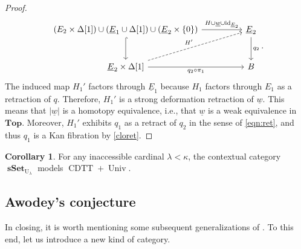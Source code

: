 \documentclass[10pt,letterpaper,cm]{nupset}
\theoremstyle{definition}
\theoremstyle{theorem}
\newtheorem{corollary}[definition]{Corollary}
\theoremstyle{remark}
\newcommand{\0}{\mathbf{0}}
\newcommand{\1}{\mathbf{1}}
\newcommand{\2}{\mathbf{2}}
\DeclareMathOperator{\cdtt}{\mathrm{CDTT}}
\DeclareMathOperator{\univ}{\mathrm{Univ}}
\DeclareMathOperator{\sset}{\mathbf{sSet}}
\DeclareMathOperator{\idd}{id}
\begin{document}
\begin{proof}
\[\begin{tikzcd}[column sep=huge, row sep=large]
{\left(E_2\times \Delta[1]\right)\cup \left(\underline{E}_1\cup \Delta[1]\right)\cup \left(\underline{E}_2\times \left\{0\right\}\right)} \arrow[d, hook] \arrow[r, "H\cup \underline{w}\cup\idd_{\underline{E}_2}"] & \underline{E}_2 \arrow[d, "q_2"] \\
{\underline{E}_2\times \Delta[1]} \arrow[r, "q_2\circ \pi_1"'] \arrow[ru, "H'", dashed]                                                                                          & B                   
\end{tikzcd}
.\]
The induced map $H_1'$ factors through $\underline{E}_1$ because $H_1$ factors through $E_1$ as a retraction of $q$. Therefore, $H_1'$ is a strong deformation retraction of $\underline{w}$. This means that $\left\lvert{\underline{w}}\right\rvert$ is a homotopy equivalence, i.e., that $\underline{w}$ is a weak equivalence in $\mathbf{Top}$. Moreover, $H_1'$ exhibits $q_1$ as a retract of $q_2$ in the sense of \eqref{eqn:ret}, and thus  $q_1$ is a Kan fibration by \cref{cloret}.


\begin{comment}
we have two diagonal fill-ins
\[
\begin{tikzcd}[row sep=large]
E_1 \arrow[d, "w"', hook] \arrow[r, equal]           & E_1 \arrow[d, "p_1"] &  & {E_2\cup \left(E_1\times \Delta[1]\right)\cup E_2} \arrow[d, hook] \arrow[r] & E_2 \arrow[d] \\
E_2 \arrow[r, "p_2"'] \arrow[ru, "r", dashed] & A                    &  & {E_2\times \Delta[1]} \arrow[r] \arrow[ru, "H", dashed]                      & A            
\end{tikzcd}
,\] so that $r$ is a strong deformation retraction of $w$ (see \cref{defret}).
\end{comment}
\end{proof}

\smallskip

\begin{corollary}
For any inaccessible cardinal $\lambda < \kappa$, the contextual category $\sset_{\mathrm{U}_{\lambda}}$ models $\cdtt+\univ$.
\end{corollary}

\subsection*{Awodey's conjecture}

In closing, it is worth mentioning some subsequent generalizations of \cite{KL}.
To this end, let us introduce a new kind of category.
\end{document}
